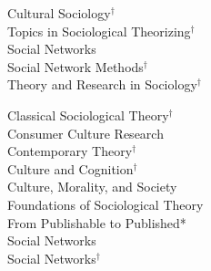 \begin{multicols}{2}
[]
\noindent
Cultural Sociology\textcolor{uclablue}{$^\dag$} \\
Topics in Sociological Theorizing\textcolor{uclablue}{$^\dag$}  \\
Social Networks \\
Social Network Methods\textcolor{uclablue}{$^\dag$} \\
Theory and Research in Sociology\textcolor{uclablue}{$^\dag$} \\
\end{multicols}  
\medskip
\begin{multicols}{2}
[]
\noindent
Classical Sociological Theory\textcolor{uclablue}{$^\dag$}   \\
Consumer Culture Research  \\
Contemporary Theory\textcolor{uclablue}{$^\dag$}  \\
Culture and Cognition\textcolor{uclablue}{$^\dag$}  \\
Culture, Morality, and Society  \\
Foundations of Sociological Theory  \\
From Publishable to Published\textcolor{uclablue}{*}   \\
Social Networks  \\
Social Networks\textcolor{uclablue}{$^\dag$}   
\end{multicols} 